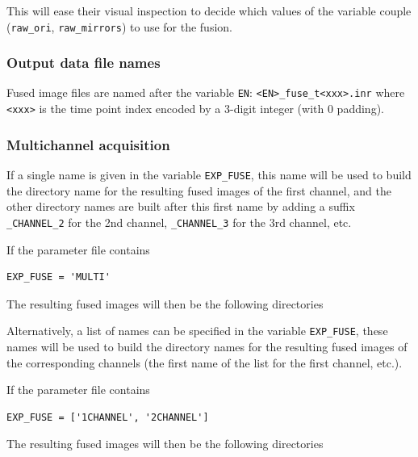 \mbox{}
\mbox{}

This will ease their visual inspection to decide which values of the variable couple
(\texttt{raw\_ori}, \texttt{raw\_mirrors}) to use for the fusion.

\subsubsection{Output data file names}
\label{sec:cli:fuse:output:data:file:names}
Fused image files are named after the variable \texttt{EN}:
\texttt{<EN>\_fuse\_t<xxx>.inr} where \texttt{<xxx>} is the time point
index encoded by a 3-digit integer (with 0 padding).


\subsubsection{Multichannel acquisition}

If a single name is given in the variable \texttt{EXP\_FUSE}, this name will be used to build the directory name for
the resulting fused images of the first channel, and the other directory names are built after this first name by adding a suffix \texttt{\_CHANNEL\_2} for the 2nd channel, \texttt{\_CHANNEL\_3} for the 3rd channel,  etc.

If the parameter file contains
\begin{verbatim}
EXP_FUSE = 'MULTI'
\end{verbatim}
The resulting fused images will then be the following directories

\mbox{}
\mbox{}

Alternatively, a list of names can be specified in the variable \texttt{EXP\_FUSE}, these names will be used to build the directory names for
the resulting fused images of the corresponding channels (the first name of the list for the first channel, etc.).


If the parameter file contains
\begin{verbatim}
EXP_FUSE = ['1CHANNEL', '2CHANNEL']
\end{verbatim}
The resulting fused images will then be the following directories

\mbox{}
\mbox{}

